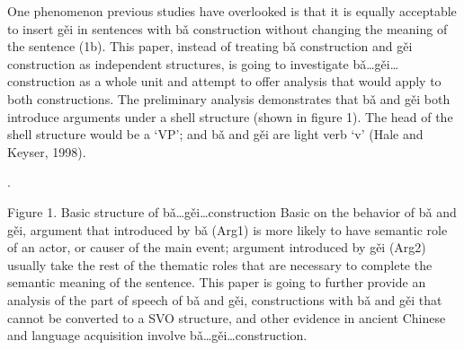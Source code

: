\documentclass[12pt, oneside]{article}   	%
\begin{document}
	One phenomenon previous studies have overlooked is that it is equally acceptable to insert gěi in sentences with bǎ construction without changing the meaning of the sentence (1b). This paper, instead of treating bǎ construction and gěi construction as independent structures, is going to investigate bǎ…gěi… construction as a whole unit and attempt to offer analysis that would apply to both constructions. 
	The preliminary analysis demonstrates that bǎ and gěi both introduce arguments under a shell structure (shown in figure 1). The head of the shell structure would be a ‘VP’; and bǎ and gěi  are light verb ‘v’ (Hale and Keyser, 1998).

 

\ex.   



			Figure 1. Basic structure of bǎ…gěi…construction
Basic on the behavior of bǎ and gěi, argument that introduced by bǎ (Arg1) is more likely to have semantic role of an actor, or causer of the main event; argument introduced by gěi (Arg2) usually take the rest of the thematic roles that are necessary to complete the semantic meaning of the sentence. This paper is going to further provide an analysis of the part of speech of bǎ and gěi, constructions with bǎ and gěi that cannot be converted to a SVO structure, and other evidence in ancient Chinese and language acquisition involve bǎ…gěi…construction. 









%
%
\end{document}
